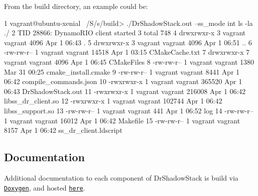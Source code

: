 From the build directory, an example could be\+: 
\begin{DoxyCode}
1 vagrant@ubuntu-xenial ~/S/s/build> ./DrShadowStack.out --ss\_mode int ls -la ./
2 TID 28866: DynamoRIO client started
3 total 748
4 drwxrwxr-x 3 vagrant vagrant   4096 Apr  1 06:43 .
5 drwxrwxr-x 3 vagrant vagrant   4096 Apr  1 06:51 ..
6 -rw-rw-r-- 1 vagrant vagrant  14518 Apr  1 03:15 CMakeCache.txt
7 drwxrwxr-x 7 vagrant vagrant   4096 Apr  1 06:45 CMakeFiles
8 -rw-rw-r-- 1 vagrant vagrant   1380 Mar 31 00:25 cmake\_install.cmake
9 -rw-rw-r-- 1 vagrant vagrant   8441 Apr  1 06:42 compile\_commands.json
10 -rwxrwxr-x 1 vagrant vagrant 365520 Apr  1 06:43 DrShadowStack.out
11 -rwxrwxr-x 1 vagrant vagrant 216008 Apr  1 06:42 libss\_dr\_client.so
12 -rwxrwxr-x 1 vagrant vagrant 102744 Apr  1 06:42 libss\_support.so
13 -rw-rw-r-- 1 vagrant vagrant    441 Apr  1 06:52 log
14 -rw-rw-r-- 1 vagrant vagrant  16012 Apr  1 06:42 Makefile
15 -rw-rw-r-- 1 vagrant vagrant   8157 Apr  1 06:42 ss\_dr\_client.ldscript
\end{DoxyCode}


\subsection*{Documentation}

Additional documentation to each component of Dr\+Shadow\+Stack is build via \href{http://www.stack.nl/~dimitri/doxygen/}{\tt Doxygen}, and hosted \href{https://zwimer.com/DrShadowStack}{\tt here}. 
